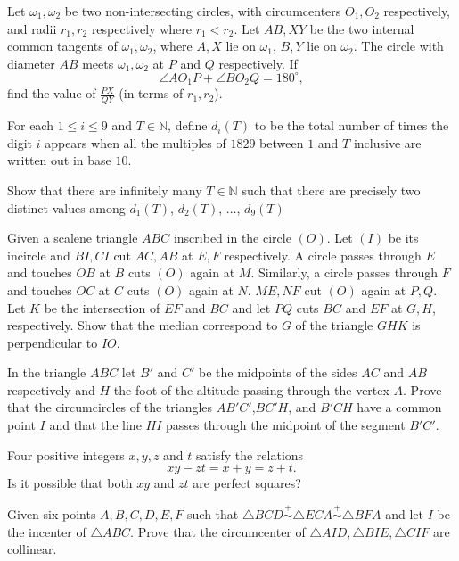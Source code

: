\documentclass[11pt]{scrartcl}
\begin{document}
\begin{problem}[689874125173032]
Let $\omega_1,\omega_2$ be two non-intersecting circles, with circumcenters $O_1,O_2$ respectively, and radii $r_1,r_2$ respectively where $r_1 < r_2$. Let $AB,XY$ be the two internal common tangents of $\omega_1,\omega_2$, where $A,X$ lie on $\omega_1$, $B,Y$ lie on $\omega_2$. The circle with diameter $AB$ meets $\omega_1,\omega_2$ at $P$ and $Q$ respectively. If$$\angle AO_1P+\angle BO_2Q=180^{\circ},$$find the value of $\frac{PX}{QY}$ (in terms of $r_1,r_2$).
\end{problem}
\begin{problem}[526922799283626]
	For each $1\leq i\leq 9$ and $T\in\mathbb N$, define $d_i(T)$ to be the total number of times the digit $i$ appears when all the multiples of $1829$ between $1$ and $T$ inclusive are written out in base $10$.

Show that there are infinitely many $T\in\mathbb N$ such that there are precisely two distinct values among $d_1(T)$, $d_2(T)$, $\dots$, $d_9(T)$
\end{problem}
\begin{problem}[86986480818494]
Given a scalene triangle $ABC$ inscribed in the circle $(O)$. Let $(I)$ be its incircle and $BI,CI$ cut $AC,AB$ at $E,F$ respectively. A circle passes through $E$ and touches $OB$ at $B$ cuts $(O)$ again at $M$. Similarly, a circle passes through $F$ and touches $OC$ at $C$ cuts $(O)$ again at $N$. $ME,NF$ cut $(O)$ again at $P,Q$. Let $K$ be the intersection of $EF$ and $BC$ and let $PQ$ cuts $BC$ and $EF$ at $G,H$, respectively. Show that the median correspond to $G$ of the triangle $GHK$ is perpendicular to $IO$.
\end{problem}
\begin{problem}[7243491713649826569]
In the triangle $ABC$ let $B'$ and $C'$ be the midpoints of the sides $AC$ and $AB$ respectively and $H$ the foot of the altitude passing through the vertex $A$. Prove that the circumcircles of the triangles $AB'C'$,$BC'H$, and $B'CH$ have a common point $I$ and that the line $HI$ passes through the midpoint of the segment $B'C'.$
\end{problem}
\begin{problem}[4678973565823282552]
Four positive integers $x,y,z$ and $t$ satisfy the relations
\[ xy - zt = x + y = z + t. \]Is it possible that both $xy$ and $zt$ are perfect squares?
\end{problem}
\begin{problem}[902621191535073]
Given six points $ A, B, C, D, E, F $ such that $ \triangle BCD \stackrel{+}{\sim} \triangle ECA \stackrel{+}{\sim} \triangle BFA $ and let $ I $ be the incenter of $ \triangle ABC. $ Prove that the circumcenter of $ \triangle AID, \triangle BIE, \triangle CIF $ are collinear.
\end{problem}
\end{document}

